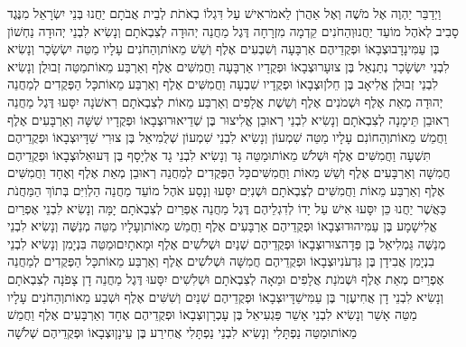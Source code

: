 \documentclass[../main/main.tex]{subfiles}
\begin{document}
\begin{multicols}{\ncols}
וַיְדַבֵּר יַהְוֶה אֶל מֹשֶׁה וְאֶל אַהֲרֹן לֵאמֹר\PreVerseSpace{}אִישׁ עַל דִּגְלוֹ בְאֹתֹת לְבֵית אֲבֹתָם יַחֲנוּ בְּנֵי יִשְׂרָאֵל מִנֶּגֶד סָבִיב לְאֹהֶל מוֹעֵד יַחֲנוּ\PreVerseSpace{}וְהַחֹנִים קֵדְמָה מִזְרָחָה דֶּגֶל מַחֲנֵה יְהוּדָה לְצִבְאֹתָם וְנָשִׂיא לִבְנֵי יְהוּדָה נַחְשׁוֹן בֶּן עַמִּינָדָב\PreVerseSpace{}וּצְבָאוֹ וּפְקֻדֵיהֶם אַרְבָּעָה וְשִׁבְעִים אֶלֶף וְשֵׁשׁ מֵאוֹת\PreVerseSpace{}וְהַחֹנִים עָלָיו מַטֵּה יִשְׂשָׂכָר וְנָשִׂיא לִבְנֵי יִשְׂשָׂכָר נְתַנְאֵל בֶּן צוּעָר\PreVerseSpace{}וּצְבָאוֹ וּפְקֻדָיו אַרְבָּעָה וַחֲמִשִּׁים אֶלֶף וְאַרְבַּע מֵאוֹת\PreVerseSpace{}מַטֵּה זְבוּלֻן וְנָשִׂיא לִבְנֵי זְבוּלֻן אֱלִיאָב בֶּן חֵלֹן\PreVerseSpace{}וּצְבָאוֹ וּפְקֻדָיו שִׁבְעָה וַחֲמִשִּׁים אֶלֶף וְאַרְבַּע מֵאוֹת\PreVerseSpace{}כָּל הַפְּקֻדִים לְמַחֲנֵה יְהוּדָה מְאַת אֶלֶף וּשְׁמֹנִים אֶלֶף וְשֵׁשֶׁת אֲלָפִים וְאַרְבַּע מֵאוֹת לְצִבְאֹתָם רִאשֹׁנָה יִסָּעוּ \ClosedSection{}דֶּגֶל מַחֲנֵה רְאוּבֵן תֵּימָנָה לְצִבְאֹתָם וְנָשִׂיא לִבְנֵי רְאוּבֵן אֱלִיצוּר בֶּן שְׁדֵיאוּר\PreVerseSpace{}וּצְבָאוֹ וּפְקֻדָיו שִׁשָּׁה וְאַרְבָּעִים אֶלֶף וַחֲמֵשׁ מֵאוֹת\PreVerseSpace{}וְהַחוֹנִם עָלָיו מַטֵּה שִׁמְעוֹן וְנָשִׂיא לִבְנֵי שִׁמְעוֹן שְׁלֻמִיאֵל בֶּן צוּרִי שַׁדָּי\PreVerseSpace{}וּצְבָאוֹ וּפְקֻדֵיהֶם תִּשְׁעָה וַחֲמִשִּׁים אֶלֶף וּשְׁלֹשׁ מֵאוֹת\PreVerseSpace{}וּמַטֵּה גָּד וְנָשִׂיא לִבְנֵי גָד אֶלְיָסָף בֶּן דְּעוּאֵל\SubEnd{}\PreVerseSpace{}וּצְבָאוֹ וּפְקֻדֵיהֶם חֲמִשָּׁה וְאַרְבָּעִים אֶלֶף וְשֵׁשׁ מֵאוֹת וַחֲמִשִּׁים\PreVerseSpace{}כָּל הַפְּקֻדִים לְמַחֲנֵה רְאוּבֵן מְאַת אֶלֶף וְאֶחָד וַחֲמִשִּׁים אֶלֶף וְאַרְבַּע מֵאוֹת וַחֲמִשִּׁים לְצִבְאֹתָם וּשְׁנִיִּם יִסָּעוּ \ClosedSection{}וְנָסַע אֹהֶל מוֹעֵד מַחֲנֵה הַלְוִיִּם בְּתוֹךְ הַמַּחֲנֹת כַּאֲשֶׁר יַחֲנוּ כֵּן יִסָּעוּ אִישׁ עַל יָדוֹ לְדִגְלֵיהֶם \ClosedSection{}דֶּגֶל מַחֲנֵה אֶפְרַיִם לְצִבְאֹתָם יָמָּה וְנָשִׂיא לִבְנֵי אֶפְרַיִם אֱלִישָׁמָע בֶּן עַמִּיהוּד\PreVerseSpace{}וּצְבָאוֹ וּפְקֻדֵיהֶם אַרְבָּעִים אֶלֶף וַחֲמֵשׁ מֵאוֹת\PreVerseSpace{}וְעָלָיו מַטֵּה מְנַשֶּׁה וְנָשִׂיא לִבְנֵי מְנַשֶּׁה גַּמְלִיאֵל בֶּן פְּדָהצוּר\PreVerseSpace{}וּצְבָאוֹ וּפְקֻדֵיהֶם שְׁנַיִם וּשְׁלֹשִׁים אֶלֶף וּמָאתָיִם\PreVerseSpace{}וּמַטֵּה בִּנְיָמִן וְנָשִׂיא לִבְנֵי בִנְיָמִן אֲבִידָן בֶּן גִּדְעֹנִי\PreVerseSpace{}וּצְבָאוֹ וּפְקֻדֵיהֶם חֲמִשָּׁה וּשְׁלֹשִׁים אֶלֶף וְאַרְבַּע מֵאוֹת\PreVerseSpace{}כָּל הַפְּקֻדִים לְמַחֲנֵה אֶפְרַיִם מְאַת אֶלֶף וּשְׁמֹנַת אֲלָפִים וּמֵאָה לְצִבְאֹתָם וּשְׁלִשִׁים יִסָּעוּ \ClosedSection{}דֶּגֶל מַחֲנֵה דָן צָפֹנָה לְצִבְאֹתָם וְנָשִׂיא לִבְנֵי דָן אֲחִיעֶזֶר בֶּן עַמִּישַׁדָּי\PreVerseSpace{}וּצְבָאוֹ וּפְקֻדֵיהֶם שְׁנַיִם וְשִׁשִּׁים אֶלֶף וּשְׁבַע מֵאוֹת\PreVerseSpace{}וְהַחֹנִים עָלָיו מַטֵּה אָשֵׁר וְנָשִׂיא לִבְנֵי אָשֵׁר פַּגְעִיאֵל בֶּן עָכְרָן\PreVerseSpace{}וּצְבָאוֹ וּפְקֻדֵיהֶם אֶחָד וְאַרְבָּעִים אֶלֶף וַחֲמֵשׁ מֵאוֹת\PreVerseSpace{}וּמַטֵּה נַפְתָּלִי וְנָשִׂיא לִבְנֵי נַפְתָּלִי אֲחִירַע בֶּן עֵינָן\PreVerseSpace{}וּצְבָאוֹ וּפְקֻדֵיהֶם שְׁלֹשָׁה 
\end{multicols}
\end{document}
